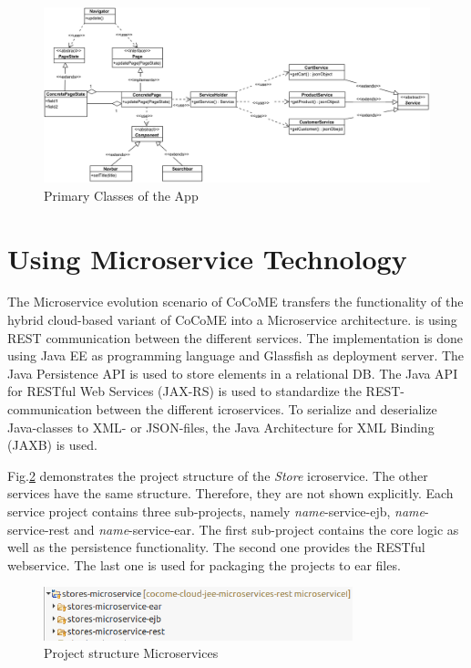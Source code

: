   
   \begin{figure}
  	\includegraphics[width=\textwidth]{img/appBasicClass.png}
  	\caption{Primary Classes of the App}
  	\label{App_ClassDiagram}
  \end{figure}

\FloatBarrier
 
 
 \section{Using Microservice Technology} \label{MicroserviceImplementation}
 The Microservice evolution scenario of CoCoME transfers the functionality of the hybrid cloud-based variant of CoCoME into a Microservice architecture.
  is using REST communication between the different services. 
 The implementation is done using Java EE as programming language and Glassfish as deployment server. 
 The Java Persistence API is used to store elements in a relational DB. 
 The Java API for RESTful Web Services (JAX-RS) is used to standardize the REST-communication between the different icroservices. 
 To serialize and deserialize Java-classes to XML- or JSON-files, the Java Architecture for XML Binding (JAXB) is used. 

 Fig.\added{~}\ref{projectStructure} demonstrates the project structure of the \textit{Store} icroservice. 
 The other services have the same structure. 
 Therefore, they are not shown explicitly.  
 Each service project contains three sub-projects, namely \textit{name}-service-ejb, \textit{name}-service-rest and \textit{name}-service-ear. 
 The first sub-project contains the core logic as well as the persistence functionality. 
 The second one provides the RESTful webservice. 
 The last one is used for packaging the projects to ear files. 
 
 
 

 
	\begin{figure}[h]
		\centering
		\includegraphics[width = 0.8\textwidth] {img/projectStructure_Micro.png}
	 	\caption{Project structure Microservices}
	 	\label{projectStructure}
	 	
 	\end{figure}
 	
